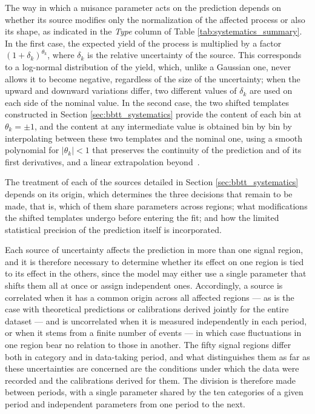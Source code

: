 The way in which a nuisance parameter acts on the prediction depends on whether its source modifies only the normalization of the affected process or also its shape, as indicated in the \textit{Type} column of Table \ref{tab:systematics_summary}. In the first case, the expected yield of the process is multiplied by a factor $(1+\delta_k)^{\theta_k}$, where $\delta_k$ is the relative uncertainty of the source. This corresponds to a log-normal distribution of the yield, which, unlike a Gaussian one, never allows it to become negative, regardless of the size of the uncertainty; when the upward and downward variations differ, two different values of $\delta_k$ are used on each side of the nominal value. In the second case, the two shifted templates constructed in Section \ref{sec:bbtt_systematics} provide the content of each bin at $\theta_k = \pm1$, and the content at any intermediate value is obtained bin by bin by interpolating between these two templates and the nominal one, using a smooth polynomial for $|\theta_k| < 1$ that preserves the continuity of the prediction and of its first derivatives, and a linear extrapolation beyond~\cite{CMS-combine}.

The treatment of each of the sources detailed in Section \ref{sec:bbtt_systematics} depends on its origin, which determines the three decisions that remain to be made, that is, which of them share parameters across regions; what modifications the shifted templates undergo before entering the fit; and how the limited statistical precision of the prediction itself is incorporated.\medskip


Each source of uncertainty affects the prediction in more than one signal region, and it is therefore necessary to determine whether its effect on one region is tied to its effect in the others, since the model may either use a single parameter that shifts them all at once or assign independent ones. Accordingly, a source is correlated when it has a common origin across all affected regions — as is the case with theoretical predictions or calibrations derived jointly for the entire dataset — and is uncorrelated when it is measured independently in each period, or when it stems from a finite number of events — in which case fluctuations in one region bear no relation to those in another. The fifty signal regions differ both in category and in data-taking period, and what distinguishes them as far as these uncertainties are concerned are the conditions under which the data were recorded and the calibrations derived for them. The division is therefore made between periods, with a single parameter shared by the ten categories of a given period and independent parameters from one period to the next.


